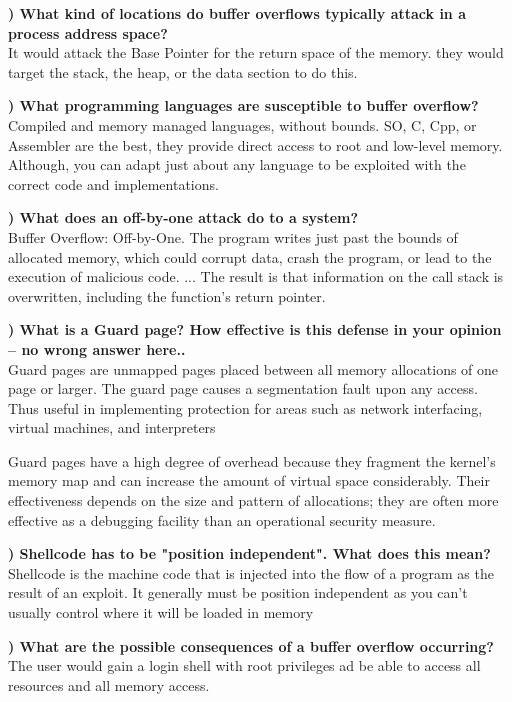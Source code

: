 \documentclass{report}
\newcommand{\mysubsection}[2]{\textbf{\romannumeral #1) #2}}
\begin{document}
\noindent\mysubsection{4}{What kind of locations do buffer overflows typically attack in a process address space?}
\\It would attack the Base Pointer for the return space of the memory. they
would target the stack, the heap, or the data section to do this.

\noindent\mysubsection{5}{What programming languages are susceptible to buffer overflow?}
\\Compiled and memory managed languages, without bounds. SO, C, Cpp, or
Assembler are the best, they provide direct access to root and low-level
memory. Although, you can adapt just about any language to be exploited with
the correct code and implementations.

\noindent\mysubsection{6}{What does an off-by-one attack do to a system?}
\\Buffer Overflow: Off-by-One. The program writes just past the 
bounds of allocated memory, which could corrupt data, crash the 
program, or lead to the execution of malicious code. ... The result 
is that information on the call stack is overwritten, including the 
function's return pointer.

\noindent\mysubsection{7}{What is a Guard page?  How effective is this defense in your opinion -- no wrong answer here..}
\\Guard pages are unmapped pages placed between all memory 
allocations of one page or larger. The guard page causes a 
segmentation fault upon any access. Thus useful in implementing 
protection for areas such as network interfacing, virtual machines, 
and interpreters

Guard pages have a high degree of overhead because they fragment 
the kernel's memory map and can increase the amount of virtual 
space considerably. Their effectiveness depends on the size and 
pattern of allocations; they are often more effective as a 
debugging facility than an operational security measure.

\noindent\mysubsection{8}{Shellcode has to be "position independent".  What does this mean?}
\\ Shellcode is the machine code that is injected into the flow of 
a program as the result of an exploit. It generally must be 
position independent as you can't usually control where it will be 
loaded in memory

\noindent\mysubsection{9}{What are the possible consequences of a buffer overflow occurring?}
\\The user would gain a login shell with root privileges ad be able to access
all resources and all memory access.
\end{document}
